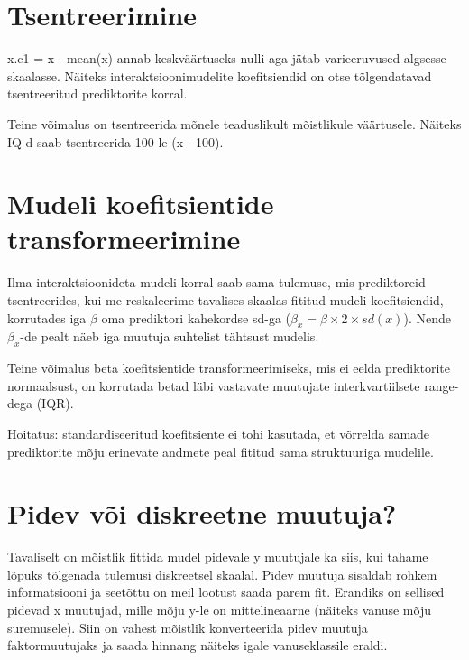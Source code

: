 \documentclass[]{book}
\begin{document}
\hypertarget{tsentreerimine}{%
\section{Tsentreerimine}\label{tsentreerimine}}

x.c1 = x - mean(x) annab keskväärtuseks nulli aga jätab varieeruvused algsesse skaalasse. Näiteks interaktsioonimudelite koefitsiendid on otse tõlgendatavad tsentreeritud prediktorite korral.

Teine võimalus on tsentreerida mõnele teaduslikult mõistlikule väärtusele. Näiteks IQ-d saab tsentreerida 100-le (x - 100).

\hypertarget{mudeli-koefitsientide-transformeerimine}{%
\section{Mudeli koefitsientide transformeerimine}\label{mudeli-koefitsientide-transformeerimine}}

Ilma interaktsioonideta mudeli korral saab sama tulemuse, mis prediktoreid tsentreerides, kui me reskaleerime tavalises skaalas fititud mudeli koefitsiendid, korrutades iga \(\beta\) oma prediktori kahekordse sd-ga (\(\beta_x = \beta \times 2 \times sd(x)\)). Nende \(\beta_x\)-de pealt näeb iga muutuja suhtelist tähtsust mudelis.

Teine võimalus beta koefitsientide transformeerimiseks, mis ei eelda prediktorite normaalsust, on korrutada betad läbi vastavate muutujate interkvartiilsete range-dega (IQR).

Hoitatus: standardiseeritud koefitsiente ei tohi kasutada, et võrrelda samade prediktorite mõju erinevate andmete peal fititud sama struktuuriga mudelile.

\hypertarget{pidev-voi-diskreetne-muutuja}{%
\section{Pidev või diskreetne muutuja?}\label{pidev-voi-diskreetne-muutuja}}

Tavaliselt on mõistlik fittida mudel pidevale y muutujale ka siis, kui tahame lõpuks tõlgenada tulemusi diskreetsel skaalal. Pidev muutuja sisaldab rohkem informatsiooni ja seetõttu on meil lootust saada parem fit. Erandiks on sellised pidevad x muutujad, mille mõju y-le on mittelineaarne (näiteks vanuse mõju suremusele). Siin on vahest mõistlik konverteerida pidev muutuja faktormuutujaks ja saada hinnang näiteks igale vanuseklassile eraldi.
\end{document}
